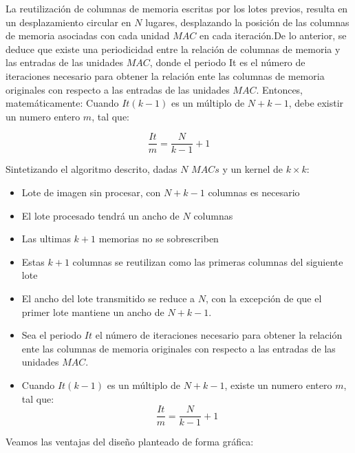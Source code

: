 \documentclass[a4paper]{article}
\begin{document}
La reutilización de columnas de memoria escritas por los lotes previos, resulta en un desplazamiento circular en $N$ lugares, desplazando la posición de las columnas de memoria asociadas con cada unidad $MAC$ en cada iteración.De lo anterior, se deduce que existe una periodicidad entre la relación de columnas de memoria y las entradas de las unidades $MAC$, donde el periodo It es el número de iteraciones necesario para obtener la relación ente las columnas de memoria originales con respecto a las entradas de las unidades $MAC$.
Entonces, matemáticamente: Cuando $It(k-1)$ es un múltiplo de $N+k-1$, debe existir un numero entero $m$, tal que:

\begin{equation}\label{niter}
  \frac{It}{m} = \frac{N}{k-1} + 1
\end{equation}

Sintetizando el algoritmo descrito, dadas $N$ $MACs$ y  un kernel de $ k \times k$:
\begin{frame}{}
	    
      \begin{itemize}

	\item Lote de imagen sin procesar,  con $N+k-1$ columnas es necesario
	\item El lote procesado tendrá un ancho de $N$ columnas
	\item Las ultimas $k+1$ memorias no se sobrescriben
	\item Estas $k+1$ columnas se reutilizan como las primeras columnas del siguiente lote
	\item El ancho del lote transmitido se reduce a $N$, con la excepción de que el primer lote mantiene un ancho de $N+k-1$.
	\item Sea el periodo $It$  el número de iteraciones necesario para obtener la relación ente las columnas de memoria originales con respecto a las entradas de las unidades $MAC$.
	\item Cuando $It(k-1)$ es un múltiplo de $N+k-1$, existe un numero entero $m$, tal que:
\begin{equation}\label{niter}
  \frac{It}{m} = \frac{N}{k-1} + 1
\end{equation}


\end{itemize}
\end{frame}

\bigskip
\bigskip
\bigskip

Veamos las ventajas del diseño planteado de forma gráfica:
\end{document}

